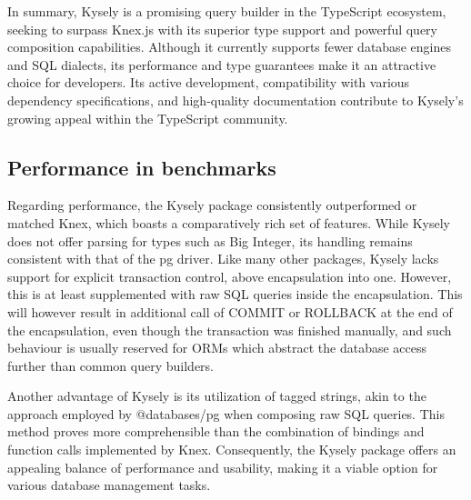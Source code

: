 In summary, Kysely is a promising query builder in the TypeScript ecosystem,
seeking to surpass Knex.js with its superior type support and powerful query
composition capabilities. Although it currently supports fewer database engines
and SQL dialects, its performance and type guarantees make it an attractive
choice for developers. Its active development, compatibility with various
dependency specifications, and high-quality documentation contribute to Kysely's
growing appeal within the TypeScript community.

\subsection{Performance in benchmarks}

Regarding performance, the Kysely package consistently outperformed or matched
Knex, which boasts a comparatively rich set of features. While Kysely does not
offer parsing for types such as Big Integer, its handling remains consistent
with that of the pg driver. Like many other packages, Kysely lacks support for
explicit transaction control, above encapsulation into one. However, this is at
least supplemented with raw SQL queries inside the encapsulation. This will
however result in additional call of COMMIT or ROLLBACK at the end of the
encapsulation, even though the transaction was finished manually, and such
behaviour is usually reserved for ORMs which abstract the database access
further than common query builders.

Another advantage of Kysely is its utilization of tagged strings, akin to the
approach employed by @databases/pg when composing raw SQL queries. This method
proves more comprehensible than the combination of bindings and function calls
implemented by Knex. Consequently, the Kysely package offers an appealing
balance of performance and usability, making it a viable option for various
database management tasks.
